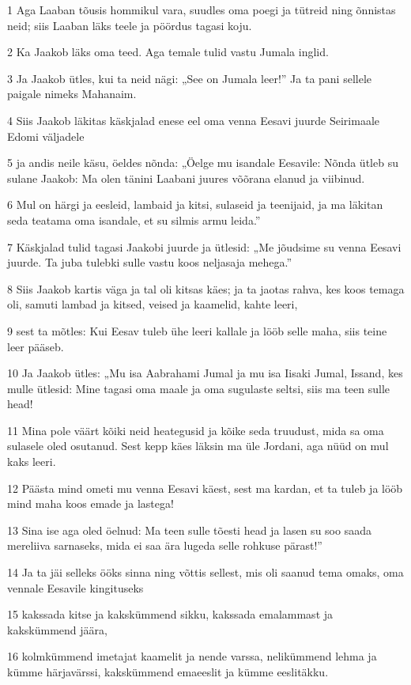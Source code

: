 \par 1 Aga Laaban tõusis hommikul vara, suudles oma poegi ja tütreid ning õnnistas neid; siis Laaban läks teele ja pöördus tagasi koju.
\par 2 Ka Jaakob läks oma teed. Aga temale tulid vastu Jumala inglid.
\par 3 Ja Jaakob ütles, kui ta neid nägi: „See on Jumala leer!” Ja ta pani sellele paigale nimeks Mahanaim.
\par 4 Siis Jaakob läkitas käskjalad enese eel oma venna Eesavi juurde Seirimaale Edomi väljadele
\par 5 ja andis neile käsu, öeldes nõnda: „Öelge mu isandale Eesavile: Nõnda ütleb su sulane Jaakob: Ma olen tänini Laabani juures võõrana elanud ja viibinud.
\par 6 Mul on härgi ja eesleid, lambaid ja kitsi, sulaseid ja teenijaid, ja ma läkitan seda teatama oma isandale, et su silmis armu leida.”
\par 7 Käskjalad tulid tagasi Jaakobi juurde ja ütlesid: „Me jõudsime su venna Eesavi juurde. Ta juba tulebki sulle vastu koos neljasaja mehega.”
\par 8 Siis Jaakob kartis väga ja tal oli kitsas käes; ja ta jaotas rahva, kes koos temaga oli, samuti lambad ja kitsed, veised ja kaamelid, kahte leeri,
\par 9 sest ta mõtles: Kui Eesav tuleb ühe leeri kallale ja lööb selle maha, siis teine leer pääseb.
\par 10 Ja Jaakob ütles: „Mu isa Aabrahami Jumal ja mu isa Iisaki Jumal, Issand, kes mulle ütlesid: Mine tagasi oma maale ja oma sugulaste seltsi, siis ma teen sulle head!
\par 11 Mina pole väärt kõiki neid heategusid ja kõike seda truudust, mida sa oma sulasele oled osutanud. Sest kepp käes läksin ma üle Jordani, aga nüüd on mul kaks leeri.
\par 12 Päästa mind ometi mu venna Eesavi käest, sest ma kardan, et ta tuleb ja lööb mind maha koos emade ja lastega!
\par 13 Sina ise aga oled öelnud: Ma teen sulle tõesti head ja lasen su soo saada mereliiva sarnaseks, mida ei saa ära lugeda selle rohkuse pärast!”
\par 14 Ja ta jäi selleks ööks sinna ning võttis sellest, mis oli saanud tema omaks, oma vennale Eesavile kingituseks
\par 15 kakssada kitse ja kakskümmend sikku, kakssada emalammast ja kakskümmend jäära,
\par 16 kolmkümmend imetajat kaamelit ja nende varssa, nelikümmend lehma ja kümme härjavärssi, kakskümmend emaeeslit ja kümme eeslitäkku.
